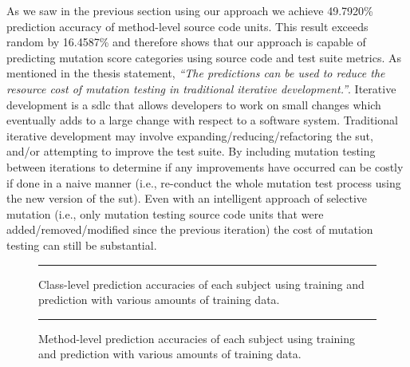 \noindent
As we saw in the previous section using our approach we achieve 49.7920\% prediction accuracy of method-level source code units. This result exceeds random by 16.4587\% and therefore shows that our approach is capable of predicting mutation score categories using source code and test suite metrics. As mentioned in the thesis statement, \emph{``The predictions can be used to reduce the resource cost of mutation testing in traditional iterative development.''}. Iterative development is a \gls{sdlc} that allows developers to work on small changes which eventually adds to a large change with respect to a software system. Traditional iterative development may involve expanding/reducing/refactoring the \gls{sut}, and/or attempting to improve the test suite. By including mutation testing between iterations to determine if any improvements have occurred can be costly if done in a naive manner (i.e., re-conduct the whole mutation test process using the new version of the \gls{sut}). Even with an intelligent approach of selective mutation (i.e., only mutation testing source code units that were added/removed/modified since the previous iteration) the cost of mutation testing can still be substantial.

\begin{figure}[!ht]
  \centering
  \begin{adjustbox}{max size={.95\textwidth}{.95\textheight}}
    
  \end{adjustbox}
  \caption{Class-level prediction accuracies of each subject using training and prediction with various amounts of training data.}
  \vspace{2mm}
  \hrule
  \label{fig:divisor_class_graph}
\end{figure}

\begin{figure}[!ht]
  \centering
  \begin{adjustbox}{max size={.95\textwidth}{.95\textheight}}
    
  \end{adjustbox}
  \caption{Method-level prediction accuracies of each subject using training and prediction with various amounts of training data.}
  \vspace{2mm}
  \hrule
  \label{fig:divisor_method_graph}
\end{figure}

